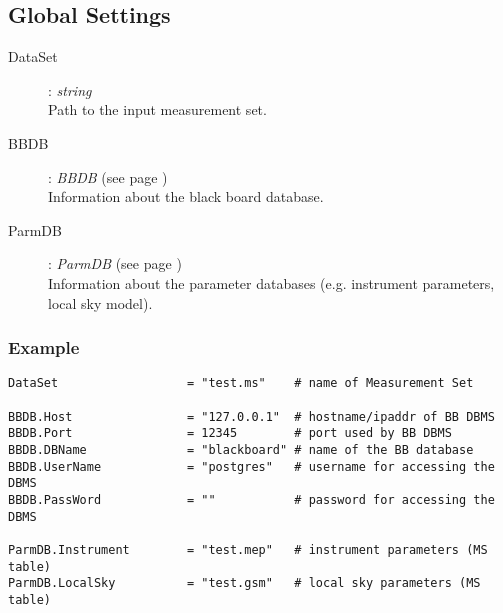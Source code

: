\documentclass[10pt]{lofar}
\begin{document}
\subsection*{Global Settings}
\begin{description}
\item [DataSet] : \emph{string} \\
    Path to the input measurement set. 
\item [BBDB] : \emph{BBDB} (see page \pageref{app-bbdb}) \\
    Information about the black board database. 
\item [ParmDB] : \emph{ParmDB} (see page \pageref{app-parmdb}) \\
    Information about the parameter databases (e.g. instrument parameters, local
sky model). 
\end{description}

\subsubsection*{Example}
{\footnotesize
\begin{verbatim}
DataSet                  = "test.ms"    # name of Measurement Set

BBDB.Host                = "127.0.0.1"  # hostname/ipaddr of BB DBMS
BBDB.Port                = 12345        # port used by BB DBMS
BBDB.DBName              = "blackboard" # name of the BB database
BBDB.UserName            = "postgres"   # username for accessing the DBMS
BBDB.PassWord            = ""           # password for accessing the DBMS

ParmDB.Instrument        = "test.mep"   # instrument parameters (MS table)
ParmDB.LocalSky          = "test.gsm"   # local sky parameters (MS table)
\end{verbatim}
}
\end{document}
